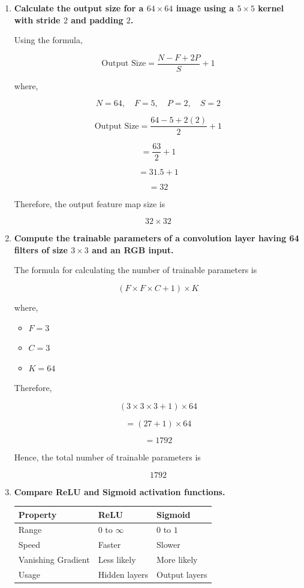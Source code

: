 \documentclass[12pt,a4paper]{article}
\begin{document}
\begin{enumerate}

\item \textbf{Calculate the output size for a \(64\times64\) image using a \(5\times5\) kernel with stride \(2\) and padding \(2\).}

Using the formula,

\[
\text{Output Size}=\frac{N-F+2P}{S}+1
\]

where,

\[
N=64,\quad F=5,\quad P=2,\quad S=2
\]

\[
\text{Output Size}
=
\frac{64-5+2(2)}{2}+1
\]

\[
=
\frac{63}{2}+1
\]

\[
=31.5+1
\]

\[
=32
\]

Therefore, the output feature map size is

\[
32\times32
\]

\item \textbf{Compute the trainable parameters of a convolution layer having 64 filters of size \(3\times3\) and an RGB input.}

The formula for calculating the number of trainable parameters is

\[
(F\times F\times C+1)\times K
\]

where,

\begin{itemize}
    \item \(F=3\)
    \item \(C=3\)
    \item \(K=64\)
\end{itemize}

Therefore,

\[
(3\times3\times3+1)\times64
\]

\[
=(27+1)\times64
\]

\[
=1792
\]

Hence, the total number of trainable parameters is

\[
1792
\]

\item \textbf{Compare ReLU and Sigmoid activation functions.}

\begin{center}
\begin{tabular}{|l|l|l|}
\hline
\textbf{Property} & \textbf{ReLU} & \textbf{Sigmoid} \\
\hline
Range & \(0\) to \(\infty\) & \(0\) to \(1\) \\
\hline
Speed & Faster & Slower \\
\hline
Vanishing Gradient & Less likely & More likely \\
\hline
Usage & Hidden layers & Output layers \\
\hline
\end{tabular}
\end{center}


\end{enumerate}
\end{document}
